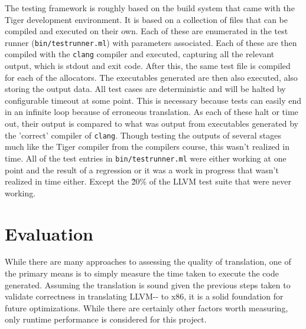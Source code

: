 \documentclass{article}
\begin{document}
The testing framework is roughly based on the build system that came with the Tiger development environment. It is based on a collection of files that can be compiled and executed on their own. Each of these are enumerated in the test runner (\texttt{bin/testrunner.ml}) with parameters associated.   Each of these are then compiled with the \texttt{clang} compiler and executed, capturing all the relevant output, which is stdout and exit code. After this, the same test file is compiled for each of the allocators. The executables generated are then also executed, also storing the output data.   All test cases are deterministic and will be  halted by configurable timeout at some point. This is necessary because tests can easily end in an infinite loop because of erroneous translation. As each of these halt or time out, their output is compared to what was output from executables generated by the 'correct' compiler of \texttt{clang}.
Though testing the outputs of several stages much like the Tiger compiler from the compilers course, this wasn't realized in time.
All of the test entries in \texttt{bin/testrunner.ml} were either working at one point and the result of a regression or it was a work in progress that wasn't realized in time either. Except the \~ 20\% of the LLVM test suite that were never working.












\section{Evaluation}

While there are many approaches to assessing the quality of translation, one of the primary means is to simply measure the time taken to execute the code generated. 
Assuming the translation is sound given the previous steps taken to validate correctness in translating LLVM-{}- to x86, it is a solid foundation for future optimizations. While there are certainly other factors worth measuring, only runtime performance is considered for this project. %
\end{document}
